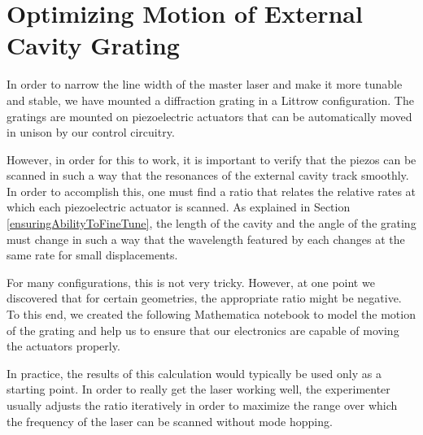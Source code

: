 \chapter{Optimizing Motion of External Cavity Grating}\label{GratingRatioAppendix}
In order to narrow the line width of the master laser and make it more tunable and stable, we have mounted a diffraction grating in a Littrow configuration. The gratings are mounted on piezoelectric actuators that can be automatically moved in unison by our control circuitry. 

However, in order for this to work, it is important to verify that the piezos can be scanned in such a way that the resonances of the external cavity track smoothly. In order to accomplish this, one must find a ratio that relates the relative rates at which each piezoelectric actuator is scanned. As explained in Section \ref{ensuringAbilityToFineTune}, the length of the cavity and the angle of the grating must change in such a way that the wavelength featured by each changes at the same rate for small displacements. 

For many configurations, this is not very tricky. However, at one point we discovered that for certain geometries, the appropriate ratio might be negative. To this end, we created the following Mathematica notebook to model the motion of the grating and help us to ensure that our electronics are capable of moving the actuators properly. 

In practice, the results of this calculation would typically be used only as a starting point. In order to really get the laser working well, the experimenter usually adjusts the ratio iteratively in order to maximize the range over which the frequency of the laser can be scanned without mode hopping. 




